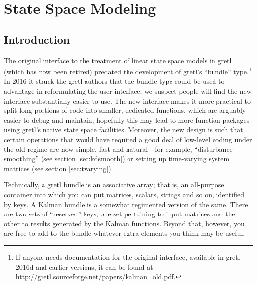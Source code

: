 \newcommand{\obsvec}{y}
\newcommand{\obsymat}{H}
\newcommand{\obsx}{x}
\newcommand{\obsxmat}{A}
\newcommand{\obsdist}{w}
\newcommand{\obsvar}{R}

\newcommand{\statevec}{\alpha}
\newcommand{\statecvar}{P}
\newcommand{\statemat}{F}
\newcommand{\strdist}{v}
\newcommand{\statevar}{Q}
\newcommand{\gain}{K}
\newcommand{\statemu}{\mu}

\newcommand{\altstatevar}{B}
\newcommand{\altobsvar}{C}
\newcommand{\alldist}{\varepsilon}

\newcommand{\prederr}{e}
\newcommand{\predvar}{\Sigma}

\newcommand{\myvec}{\mbox{vec}}
\newcommand{\myvech}{\mbox{vech}}

\chapter{State Space Modeling}
\label{chap:kalman}

\section{Introduction}
\label{sec:amble}

The original interface to the treatment of linear state space models
in gretl (which has now been retired) predated the development of
gretl's ``bundle'' type.\footnote{If anyone needs documentation for
  the original interface, available in gretl 2016d and earlier
  versions, it can be found at
  \url{http://gretl.sourceforge.net/papers/kalman_old.pdf}.}  In 2016
it struck the gretl authors that the bundle type could be used to
advantage in reformulating the user interface; we suspect people will
find the new interface substantially easier to use. The new interface
makes it more practical to split long portions of code into smaller,
dedicated functions, which are arguably easier to debug and maintain;
hopefully this may lead to more function packages using gretl's native
state space facilities. Moreover, the new design is such that certain
operations that would have required a good deal of low-level coding
under the old regime are now simple, fast and natural---for example,
``disturbance smoothing'' (see section \ref{sec:kdsmooth}) or setting
up time-varying system matrices (see section \ref{sec:tvarying}).

Technically, a gretl bundle is an associative array; that is, an
all-purpose container into which you can put matrices, scalars,
strings and so on, identified by keys. A Kalman bundle is a somewhat
regimented version of the same. There are two sets of ``reserved''
keys, one set pertaining to input matrices and the other to results
generated by the Kalman functions.  Beyond that, however, you are free
to add to the bundle whatever extra elements you think may be useful.

